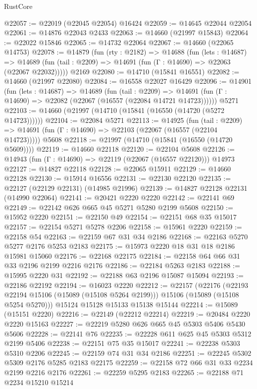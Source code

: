 \begin{lexlean}{RustCore}
\begin{coremodule}
@22057 := @22019 (@22045 @22054) @16424
@22059 := @14645 @22044 @22054
@22061 := @14876 @22043 @2433
@22063 := @14660 (@21997 @15843)
@22064 := @22022 @15846
@22065 := @14732 @22064
@22067 := @14660 (@22065 @14753)
@22078 := @14879
    (fun (rty : @2182) =>
    @14688
      (fun (lets : @14687) =>
      @14689 (fun (tail : @2209) => @14691 (fun (Γ : @14690) => @22063 (@22067 @22032)))))
    @2169
@22080 := @14710 (@15841 @16551)
@22082 := @14660 (@21997 @22080)
@22084 := @16558 @22027 @16429
@22096 := @14901
    (fun (lets : @14687) =>
    @14689
      (fun (tail : @2209) =>
      @14691 (fun (Γ : @14690) => @22082 (@22067 (@16557 (@22084 @14721 @14723))))))
    @5271
@22103 := @14660 (@21997 (@14710 (@15841 (@16550 (@14720 (@5272 @14723))))))
@22104 := @22084 @5271
@22113 := @14925
    (fun (tail : @2209) => @14691 (fun (Γ : @14690) => @22103 (@22067 (@16557 (@22104 @14723)))))
    @5608
@22118 := @21997 (@14710 (@15841 (@16550 (@14720 @5609))))
@22119 := @14660 @22118
@22120 := @22104 @5608
@22126 := @14943 (fun (Γ : @14690) => @22119 (@22067 (@16557 @22120))) @14973
@22127 := @14827 @22118
@22128 := @22065 @15911
@22129 := @14660 @22128
@22130 := @15914 @16556
@22131 := @22130 @22120
@22135 := @22127 (@22129 @22131) (@14985 @21996)
@22139 := @14827 @22128 @22131 (@14990 @22064)
@22141 := @20421 @2220 @2220
@22142 := @22141 @69
@22149 := @22142 @626 @665 @45 @5271 @5280 @2199 @5608
@22150 := @15952 @2220
@22151 := @22150 @49
@22154 := @22151 @68 @35 @15017
@22157 := @22154 @5271 @5278 @2206
@22158 := @15961 @2220
@22159 := @22158 @54
@22163 := @22159 @67 @31 @34 @2186
@22168 := @22163 @5270 @5277 @2176 @5253 @2183
@22175 := @15973 @2220 @18 @31 @18 @2186 @15981 @15060
@22176 := @22168 @22175
@22184 := @22158 @64 @66 @31 @33 @2196 @2199 @2216 @2176
@22186 := @22184 @5263 @2183
@22188 := @15995 @2220 @31
@22192 := @22188 @63 @2196 @15087 @15094
@22193 := @22186 @22192
@22194 := @16023 @2220
@22212 := @22157
    (@22176
      (@22193 @22194 @15106 (@15089 (@15108 @5264 @2199)))
      @15106
      (@15089 (@15108 @5254 @5270)))
    @15124
    @15128
    @15133
    @15138
    @15144
@22214 := @15089 (@15151 @2220)
@22216 := @22149 (@22212 @22214)
@22219 := @20484 @2220 @2220 @15163
@22227 := @22219 @5280 @626 @665 @45 @5303 @5406 @5430 @5606
@22228 := @22141 @76
@22235 := @22228 @611 @625 @45 @5303 @5312 @2199 @5406
@22238 := @22151 @75 @35 @15017
@22241 := @22238 @5303 @5310 @2206
@22245 := @22159 @74 @31 @34 @2186
@22251 := @22245 @5302 @5309 @2176 @5285 @2183 @22175
@22259 := @22158 @72 @66 @31 @33 @2234 @2199 @2216 @2176
@22261 := @22259 @5295 @2183
@22265 := @22188 @71 @2234 @15210 @15214

\end{coremodule}
\end{lexlean}
